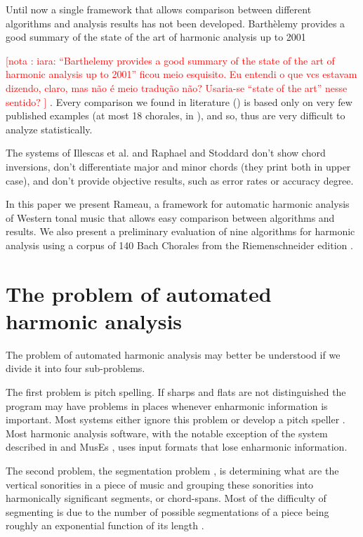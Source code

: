 \documentclass{article}
\newcounter{notacounter}
\newcommand{\nota}[1]{
  \addtocounter{notacounter}{1}
  \textcolor{red}{[nota \arabic{notacounter}: #1]}
}
\begin{document}
Until now a single framework that allows comparison between different
algorithms and analysis results has not been developed. Barthèlemy
\cite{barthelemy.ea:figured} provides a good summary of the state of
the art of harmonic analysis up to 2001 \nota{iara: ``Barthelemy
  provides a good summary of the state of the art of harmonic analysis
  up to 2001'' ficou meio esquisito. Eu entendi o que vcs estavam
  dizendo, claro, mas não é meio tradução não? Usaria-se ``state of
  the art'' nesse sentido? }. Every comparison we found in literature
(\cite{pardo.ea:automated, barthelemy.ea:figured, tsui:harmonic,
  taube:automatic, illescas.ea:harmonic}) is based only on very few
published examples (at most 18 chorales, in \cite{tsui:harmonic}), and
so, thus are very difficult to analyze statistically.

The systems of Illescas et al. \cite{illescas.ea:harmonic} and Raphael
and Stoddard \cite{raphael.ea:harmonic} don't show chord inversions,
don't differentiate major and minor chords (they print both in upper
case), and don't provide objective results, such as error rates or
accuracy degree.

In this paper we present Rameau, a framework for automatic harmonic
analysis of Western tonal music that allows easy comparison between
algorithms and results. We also present a preliminary evaluation of
nine algorithms for harmonic analysis using a corpus of 140 Bach
Chorales from the Riemenschneider edition \cite{bach:371}.

\section{The problem of automated harmonic analysis}
\label{sec:problem}

The problem of automated harmonic analysis may better be understood if
we divide it into four sub-problems.

The first problem is pitch spelling. If sharps and flats are not
distinguished the program may have problems in places whenever
enharmonic information is important. Most systems either ignore this
problem or develop a pitch speller \cite{temperley.ea:modeling}. Most
harmonic analysis software, with the notable exception of the system
described in \cite{illescas.ea:harmonic} and MusEs
\cite{pachet.ea:representing}, uses input formats that lose
enharmonic information.

The second problem, the segmentation problem
\cite{pardo.ea:automated}, is determining what are the vertical
sonorities in a piece of music and grouping these sonorities into
harmonically significant segments, or chord-spans. Most of the
difficulty of segmenting is due to the number of possible
segmentations of a piece being roughly an exponential function of its
length \cite{pardo.ea:algorithms}.
\end{document}
